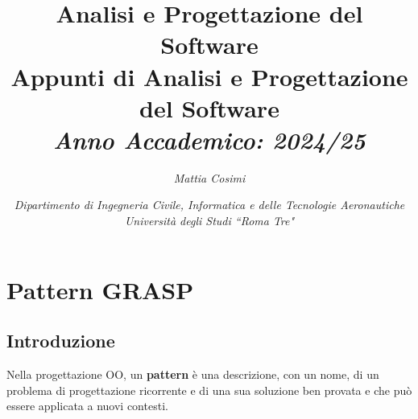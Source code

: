 \documentclass{article}
\numberwithin{equation}{subsection}
\begin{document}
\title{%
    \textbf{Analisi e Progettazione del Software}  \\ 
    \large Appunti di Analisi e Progettazione del Software\\
    \textit{Anno Accademico: 2024/25}}
\author{\textit{Mattia Cosimi}}
\date{\textit{Dipartimento di Ingegneria Civile, Informatica e delle Tecnologie Aeronautiche \\
Università degli Studi ``Roma Tre"}}

\maketitle


\clearpage

\pagestyle{fancy}
\fancyhead{}\fancyfoot{}
\fancyfoot[C]{\thepage}

\tableofcontents

\clearpage


\section{Pattern GRASP}
\subsection{Introduzione}
Nella progettazione OO, un \textbf{pattern} è una descrizione, con un nome, di un problema di progettazione ricorrente e di una sua soluzione ben provata e che può essere applicata a nuovi contesti.
\end{document}
